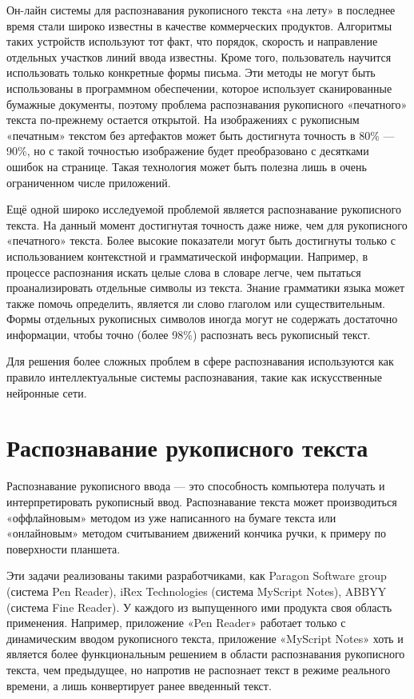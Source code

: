 Он-лайн системы для распознавания рукописного текста «на лету» в последнее время стали широко известны в качестве коммерческих продуктов. Алгоритмы таких устройств используют тот факт, что порядок, скорость и направление отдельных участков линий ввода известны. Кроме того, пользователь научится использовать только конкретные формы письма. Эти методы не могут быть использованы в программном обеспечении, которое использует сканированные бумажные документы, поэтому проблема распознавания рукописного «печатного» текста по-прежнему остается открытой. На изображениях с рукописным «печатным» текстом без артефактов может быть достигнута точность в 80\% — 90\%, но с такой точностью изображение будет преобразовано с десятками ошибок на странице. Такая технология может быть полезна лишь в очень ограниченном числе приложений.

Ещё одной широко исследуемой проблемой является распознавание рукописного текста. На данный момент достигнутая точность даже ниже, чем для рукописного «печатного» текста. Более высокие показатели могут быть достигнуты только с использованием контекстной и грамматической информации. Например, в процессе распознания искать целые слова в словаре легче, чем пытаться проанализировать отдельные символы из текста. Знание грамматики языка может также помочь определить, является ли слово глаголом или существительным. Формы отдельных рукописных символов иногда могут не содержать достаточно информации, чтобы точно (более 98\%) распознать весь рукописный текст.

Для решения более сложных проблем в сфере распознавания используются как правило интеллектуальные системы распознавания, такие как искусственные нейронные сети.

\section{Распознавание рукописного текста}

Распознавание рукописного ввода — это способность компьютера получать и интерпретировать рукописный ввод. Распознавание текста может производиться «оффлайновым» методом из уже написанного на бумаге текста или «онлайновым» методом считыванием движений кончика ручки, к примеру по поверхности планшета.

Эти задачи реализованы такими разработчиками, как Paragon Software group
(система Pen Reader), iRex Technologies (система MyScript Notes), ABBYY (система
Fine Reader). У каждого из выпущенного ими продукта своя область применения.
Например, приложение «Pen Reader» работает только с динамическим вводом
рукописного текста, приложение «MyScript Notes» хоть и является более
функциональным решением в области распознавания рукописного текста, чем
предыдущее, но напротив не распознает текст в режиме реального времени, а лишь
конвертирует ранее введенный текст.

